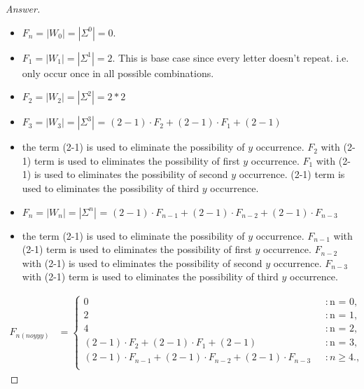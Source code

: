 \documentclass[11pt]{article}
\theoremstyle{definition}
\theoremstyle{definition}
\theoremstyle{definition}
\begin{document}
\begin{proof}[Answer]
\begin{itemize}
\item $F_n = |W_0|  = |\Sigma^{0}| = 0$.
\item $F_1 = |W_1|  = |\Sigma^{1}| = 2$. This is base case since every letter doesn't repeat. i.e. only occur once in all possible combinations.
\item $F_2 = |W_2|  = |\Sigma^{2}| = 2*2$
\item $F_3 = |W_3|  = |\Sigma^{3}|$ = $(2-1)\cdot F_2 + (2-1)\cdot F_1 + (2-1) $ 
\item the term (2-1) is used to eliminate the possibility of $y$ occurrence. $F_2$ with (2-1) term is used to eliminates the possibility of first $y$ occurrence. $F_1$ with (2-1) is used to eliminates the possibility of second $y$ occurrence. (2-1) term is used to eliminates the possibility of third $y$ occurrence.

\item $F_n = |W_n|  = |\Sigma^{n}|$ = $(2-1)\cdot F_{n-1} + (2-1)\cdot F_{n-2} + (2-1)\cdot F_{n-3} $ 
\item the term (2-1) is used to eliminate the possibility of $y$ occurrence. $F_{n-1}$ with (2-1) term is used to eliminates the possibility of first $y$ occurrence. $F_{n-2}$ with (2-1) is used to eliminates the possibility of second $y$ occurrence. $F_{n-3}$ with (2-1) term is used to eliminates the possibility of third $y$ occurrence.
\end{itemize}

\begin{align*}
F_{n(noyyy)} &= \begin{cases} \text{0} & : \text{n = 0}, \\ 
\text{2} & : \text{n = 1},\\
\text{4} & : \text{n = 2},\\
\text{$(2-1)\cdot F_2 + (2-1)\cdot F_1 + (2-1) $} & : \text{n = 3},\\
\text{$(2-1)\cdot F_{n-1} + (2-1)\cdot F_{n-2} + (2-1)\cdot F_{n-3} $ } & : \text{$n \geq 4$}.,\\
\end{cases}
\end{align*}


\end{proof}
\end{document}
